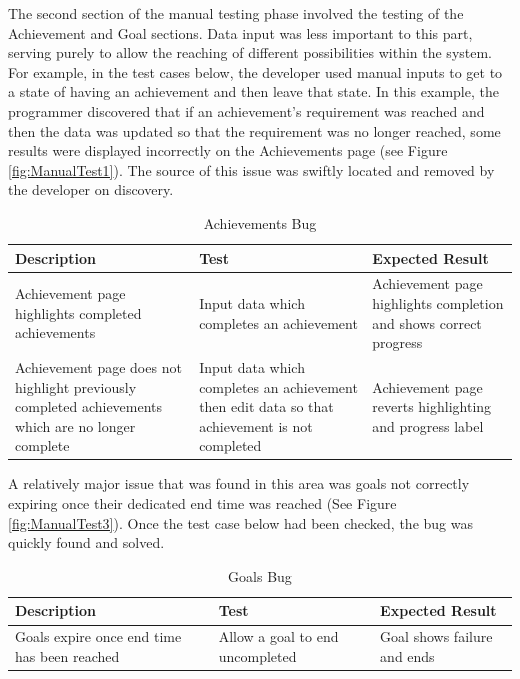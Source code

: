 \documentclass[11pt]{article}
\begin{document}
The second section of the manual testing phase involved the testing of the
Achievement and Goal sections. Data input was less important to this part,
serving purely to allow the reaching of different possibilities within the
system. For example, in the test cases below, the developer used manual inputs
to get to a state of having an achievement and then leave that state. In this
example, the programmer discovered that if an achievement's requirement was
reached and then the data was updated so that the requirement was no longer
reached, some results were displayed incorrectly on the Achievements page (see
Figure \ref{fig:ManualTest1}). The source of this issue was swiftly located and
removed by the developer on discovery.\par

\begin{table}[!ht]
\centering
\begin{tabular}{|p{5cm}|p{5cm}|p{5cm}|}
    \hline
    \textbf{Description} & \textbf{Test} & \textbf{Expected Result} \\
    \hline
    Achievement page highlights completed achievements & Input data which 
    completes an achievement & Achievement page highlights completion and 
    shows correct progress \\
    \hline
    Achievement page does not highlight previously completed achievements 
    which are no longer complete & Input data which completes an achievement 
    then edit data so that achievement is not completed & Achievement page 
    reverts highlighting and progress label \\
    \hline
\end{tabular}
\caption{Achievements Bug}
\label{table:man2} 
\end{table} 


A relatively major issue that was found in this area was goals not correctly
expiring once their dedicated end time was reached (See Figure
\ref{fig:ManualTest3}). Once the test case below had been checked, the bug was
quickly found and solved.\par

\begin{table}[!ht]
\centering
\begin{tabular}{|p{5cm}|p{5cm}|p{5cm}|}
    \hline
    \textbf{Description} & \textbf{Test} & \textbf{Expected Result} \\
    \hline
    Goals expire once end time has been reached & Allow a goal to end uncompleted & Goal shows failure and ends \\
    \hline
\end{tabular}
\caption{Goals Bug}
\label{man3}
\end{table}
\end{document}
